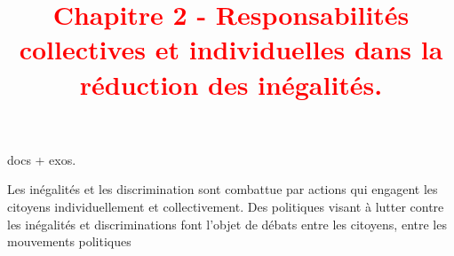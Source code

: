 \documentclass{beamer}
\title{{\textcolor{red}{Chapitre 2 - Responsabilités collectives et individuelles dans la réduction des inégalités.}}}
\begin{document}
 \begin{frame}
  \titlepage %
  \end{frame}
  
  \begin{frame}
  \tableofcontents
  \end{frame}
       
 
 
 
 
 \begin{frame}

 \end{frame}

docs + exos.

Les inégalités et les discrimination sont combattue par actions qui engagent les citoyens individuellement et collectivement. Des politiques visant à lutter contre les inégalités et discriminations font l'objet de débats entre les citoyens, entre les mouvements politiques

 
 
\end{document}
